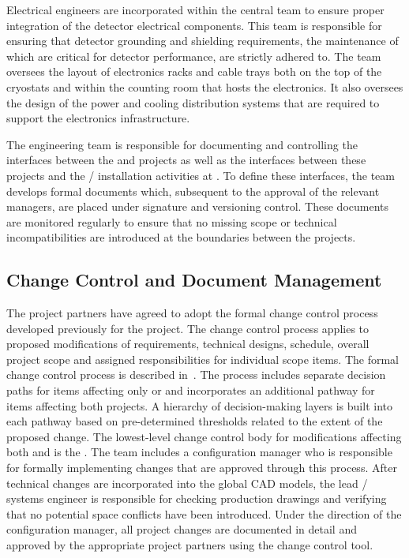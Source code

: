 Electrical engineers are incorporated within the central
 team to ensure proper integration
of the detector electrical components.  This team is responsible 
for ensuring that detector grounding and shielding requirements, 
the maintenance of which are critical for detector performance, 
are strictly adhered to.  The team oversees the layout of 
electronics racks and cable trays both on the top of the cryostats 
and within the  counting room that hosts the  
electronics.  It also oversees the design of the power and cooling 
distribution systems that are required to support the electronics 
infrastructure.

The  engineering team is responsible for documenting and
controlling the interfaces between the  and  
projects as well as the interfaces between these projects and the 
/  installation activities 
at .  To define these interfaces, the  team 
develops formal documents which, subsequent to the approval of the 
relevant managers, are placed under signature and versioning control.  
These documents are monitored regularly to ensure that no missing 
scope or technical incompatibilities are introduced at the boundaries 
between the projects.

\subsection{Change Control and Document Management}
\label{sec:dune_changecontrol}

The  project partners have agreed to adopt 
the formal change control process developed previously for the 
 project.  The change control process applies to 
proposed modifications of requirements, technical designs, 
schedule, overall project scope and assigned responsibilities 
for individual scope items.  The formal  
change control process is described in~.  The 
process includes separate decision paths for items affecting 
only  or  and incorporates an additional 
pathway for items affecting both projects.  A hierarchy of 
decision-making layers is built into each pathway based on 
pre-determined thresholds related to the extent of the proposed 
change.  The lowest-level change control body for modifications 
affecting both  and  is the .  
The  team includes a configuration manager who is 
responsible for formally implementing changes that are approved 
through this process.  After technical changes are incorporated 
into the global \threed CAD models, the lead / 
systems engineer is responsible for checking production drawings 
and verifying that no potential space conflicts have been 
introduced.  Under the direction of the configuration manager, 
all project changes are documented in detail and approved by 
the appropriate project partners using the  change 
control tool.

